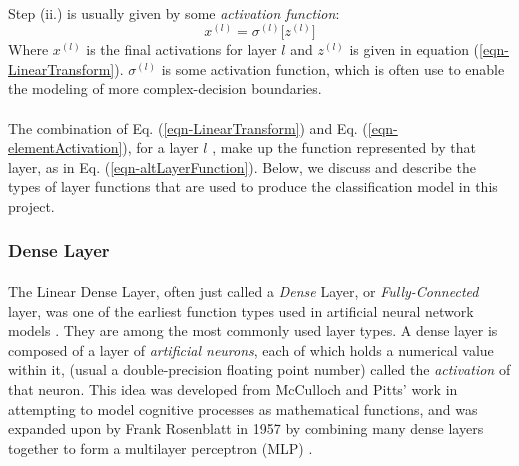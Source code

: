 \documentclass[12pt,letterpaper]{article}
\begin{document}
\paragraph*{}Step (ii.) is usually given by some \textit{activation function}:
\begin{equation}
\label{eqn-elementActivation}
x^{(l)} = \sigma^{(l)} \big[ z^{(l)} \big]
\end{equation}
Where $x^{(l)}$ is the final activations for layer $l$ and $z^{(l)}$ is given in equation (\ref{eqn-LinearTransform}). $\sigma^{(l)}$ is some activation function, which is often use to enable the modeling of more complex-decision boundaries. 

\paragraph*{}The combination of Eq. (\ref{eqn-LinearTransform}) and Eq. (\ref{eqn-elementActivation}), for a layer $l$ , make up the function represented by that layer, as in Eq. (\ref{eqn-altLayerFunction}). Below, we discuss and describe the types of layer functions that are used to produce the classification model in this project.


\subsubsection{Dense Layer}
\label{subsubsec-DenseLayer}

\paragraph*{}The Linear Dense Layer, often just called a \textit{Dense} Layer, or \textit{Fully-Connected} layer, was one of the earliest function types used in artificial neural network models \cite{Geron2,Loy,McCulloch}. They are among the most commonly used layer types. A dense layer is composed of a layer of \textit{artificial neurons}, each of which holds a numerical value within it, (usual a double-precision floating point number) called the \textit{activation} of that neuron. This idea was developed from McCulloch and Pitts' work \cite{McCulloch} in attempting to model cognitive processes as mathematical functions, and was expanded upon by Frank Rosenblatt in  1957 by combining many dense layers together to form a multilayer perceptron (MLP) \cite{Geron,Loy,Levine}.
\end{document}
